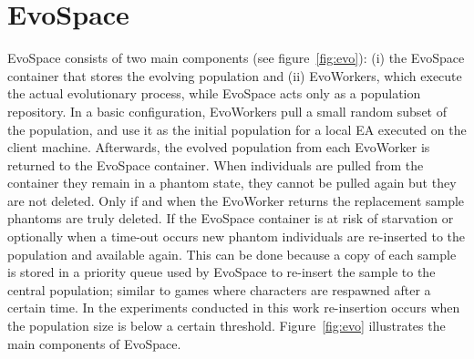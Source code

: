 \documentclass{llncs}
\begin{document}
 
\section{EvoSpace}
\label{sec:evo}

EvoSpace \cite{Evospace} consists of two main components (see figure~\ref{fig:evo}): (i) the EvoSpace 
container that stores the evolving population and (ii) EvoWorkers, which execute 
the actual evolutionary process, while EvoSpace acts only as a population repository.
In a basic configuration, EvoWorkers pull a small random subset of the 
population, and use it as the initial population for a local EA executed 
on the client machine. Afterwards, the evolved population from each EvoWorker 
is returned to the EvoSpace container. When individuals are pulled from the 
container they remain in a phantom state, they cannot be pulled again but 
they are not deleted. Only if and when the EvoWorker returns the replacement 
sample phantoms are truly deleted. If the EvoSpace container is at risk of 
starvation or optionally when a time-out occurs new phantom individuals are 
re-inserted to the population and available again. This can be done because a 
copy of each sample is stored in a priority queue used by EvoSpace to re-insert 
the sample to the central population; similar to games where characters are 
respawned after a certain time. In the experiments conducted in this work 
re-insertion occurs when the population size is below a certain threshold. 
Figure~\ref{fig:evo} illustrates the main components of EvoSpace.
\end{document}
